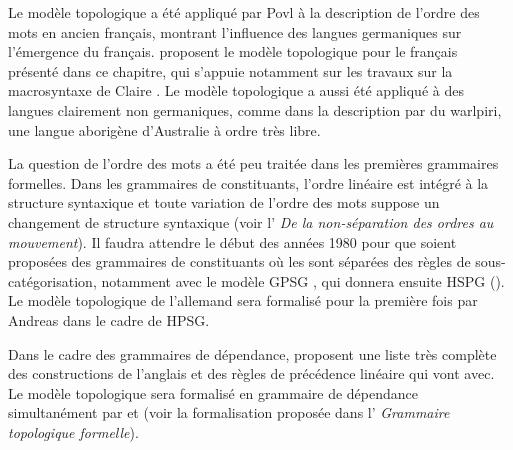 {    Le modèle topologique a été appliqué par Povl \citet{skaarup1975premieres} à la description de l’ordre des mots en ancien français, montrant l’influence des langues germaniques sur l’émergence du français. \citet{gerdes2006amas} proposent le modèle topologique pour le français présenté dans ce chapitre, qui s’appuie notamment sur les travaux sur la macrosyntaxe de Claire \citet{blanche-benveniste1990francais}. Le modèle topologique a aussi été appliqué à des langues clairement non germaniques, comme dans la description par \citet{DonohueSag1999} du warlpiri, une langue aborigène d’Australie à ordre très libre.

    La question de l’ordre des mots a été peu traitée dans les premières grammaires formelles. Dans les grammaires de constituants, l’ordre linéaire est intégré à la structure syntaxique et toute variation de l’ordre des mots suppose un changement de structure syntaxique (voir l’ \textit{De la non-séparation des ordres au mouvement}). Il faudra attendre le début des années 1980 pour que soient proposées des grammaires de constituants où les  sont séparées des règles de sous-catégorisation, notamment avec le modèle GPSG \citep{gazdar1985generalized}, qui donnera ensuite HSPG (\citealt{PollardSag1987}). Le modèle topologique de l’allemand sera formalisé pour la première fois par Andreas \citet{kathol1995linearization-based} dans le cadre de HPSG.

    Dans le cadre des grammaires de dépendance, \citet{melcuk1987surface} proposent une liste très complète des constructions de l’anglais et des règles de précédence linéaire qui vont avec. Le modèle topologique sera formalisé en grammaire de dépendance simultanément par \citet{duchier2001topological} et \citet{gerdes2001word} (voir la formalisation proposée dans l’ \textit{Grammaire topologique formelle}).
}
